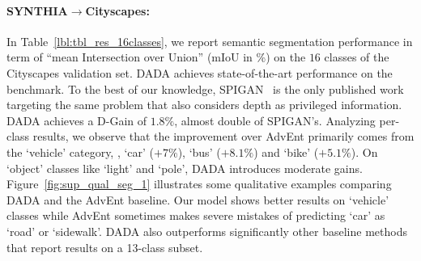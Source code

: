 \documentclass[10pt,twocolumn,letterpaper]{article}
\begin{document}
\paragraph{SYNTHIA$\rightarrow$Cityscapes:}
In Table~\ref{lbl:tbl_res_16classes}, we report semantic segmentation performance in term of ``mean Intersection over Union'' (mIoU in \%) on the $16$ classes of the Cityscapes validation set.
DADA achieves state-of-the-art performance on the benchmark.
To the best of our knowledge, SPIGAN~\cite{lee2018spigan} is the only published work targeting the same problem that also considers depth as privileged information.
DADA achieves a D-Gain of $1.8\%$, almost double of SPIGAN's.
Analyzing per-class results, we observe that the improvement over AdvEnt \cite{vu2018advent} primarily comes from the `vehicle' category, \ie, `car' ($+7\%$), `bus' ($+8.1\%$) and `bike' ($+5.1\%$).
On `object' classes like `light' and `pole', DADA introduces moderate gains.
Figure~\ref{fig:sup_qual_seg_1} illustrates some qualitative examples comparing DADA and the AdvEnt baseline.
Our model shows better results on `vehicle' classes while AdvEnt sometimes makes severe mistakes of predicting `car' as `road' or `sidewalk'.
DADA also outperforms significantly other baseline methods that report results on a 13-class subset.
\end{document}
